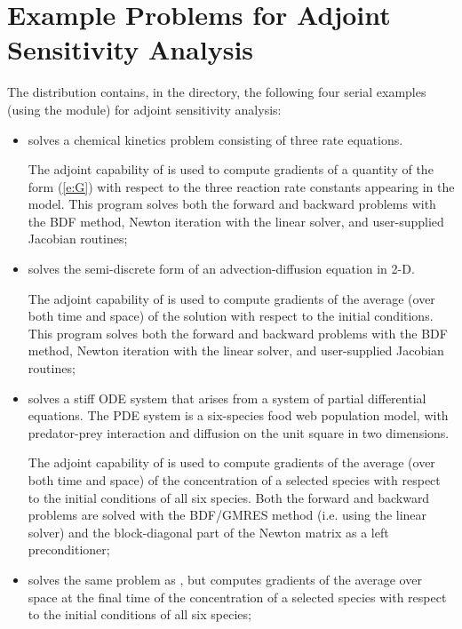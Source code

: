 \section{Example Problems for Adjoint Sensitivity Analysis}\label{s:adj_examples}

The {\cvodes} distribution contains, in the 
directory, the following four serial examples (using the {\nvecs} module)
for adjoint sensitivity analysis:
\begin{itemize}
\item {}
  solves a chemical kinetics problem consisting of three rate equations.
  
  The adjoint capability of {\cvodes} is used to compute gradients
  of a quantity of the form (\ref{e:G}) with respect to the three
  reaction rate constants appearing in the model.
  This program solves both the forward and backward problems with the BDF method, 
  Newton iteration with the {\cvdense} linear solver, and user-supplied    
  Jacobian routines;
\item {}
  solves the semi-discrete form of an advection-diffusion equation in 2-D.

  The adjoint capability of {\cvodes} is used to compute gradients
  of the average (over both time and space) of the solution with respect to
  the initial conditions.
  This program solves both the forward and backward problems with the BDF method, 
  Newton iteration with the {\cvband} linear solver, and user-supplied     
  Jacobian routines;
\item {}
  solves a stiff ODE system that arises from a system     
  of partial differential equations.  The PDE system is a six-species
  food web population model, with predator-prey interaction and diffusion 
  on the unit square in two dimensions.

  The adjoint capability of {\cvodes} is used to compute gradients
  of the average (over both time and space) of the concentration of a selected species
  with respect to the initial conditions of all six species.
  Both the forward and backward problems are solved with the BDF/GMRES method 
  (i.e. using the {\cvspgmr} linear solver) and the block-diagonal part of the  
  Newton matrix as a left preconditioner;
\item {}
  solves the same problem as , but computes gradients
  of the average over space at the final time of the concentration of a selected species
  with respect to the initial conditions of all six species;
\end{itemize}

